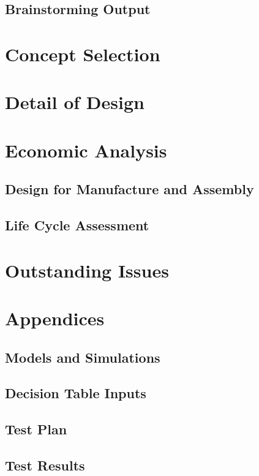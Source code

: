 \documentclass{article}
\begin{document}
\subsection{Brainstorming Output}


\section{Concept Selection}


\section{Detail of Design}

\section{Economic Analysis}
\subsection{Design for Manufacture and Assembly}

\subsection{Life Cycle Assessment}


\section{Outstanding Issues}

\section{Appendices}
\subsection{Models and Simulations}
\subsection{Decision Table Inputs}
\subsection{Test Plan}

\subsection{Test Results}
\end{document}
